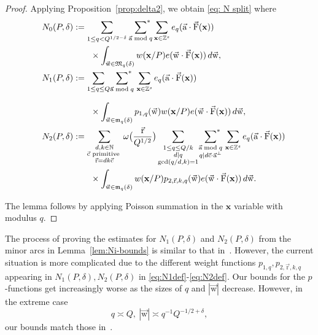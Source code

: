 \documentclass[letterpaper,11pt]{amsart}
\numberwithin{equation}{section}
\theoremstyle{definition}
\numberwithin{equation}{section}
\newcommand{\Z}{\mathbb{Z}}
\newcommand{\NN}{\mathbb{N}}
\newcommand{\x}{\mathbf{x}}
\newcommand{\starsum}{\sideset{}{^*}\sum}
\newcommand{\ua}{\vec{\mathrm{a}}}
\newcommand{\ur}{\vec{\mathrm{r}}}
\newcommand{\uw}{{\vec{\mathrm{w}}}}
\newcommand{\uF}{{\vec{\mathrm{F}} }}
\newcommand{\uc}{{\vec{\mathrm{c}}}}
\newcommand{\scrm}{\mathfrak{m}}
\newcommand{\nF}{\uF}
\begin{document}
\begin{proof}
Applying Proposition~\ref{prop:delta2}, we obtain \eqref{eq: N split}
where 
\begin{align*}
\quad N_0(P, \delta)&:=\sum_{1\leq q< Q^{1/2-\delta}}
			\,\,{\starsum_{\ua\bmod{q}}}\sum_{\x\in \Z^s}e_q(\ua \cdot \nF(\x))			
			\\\ &\quad \quad \times\int_{\uw\in \mathfrak M_q(\delta)}
			w(\x/P)e(\uw\cdot \nF(\x))\,d\uw,\\
	\quad N_1(P, \delta)&:=\sum_{1\leq q\leq Q}
			\underset{\hphantom{\ua\bmod{q}}}{\starsum_{\ua\bmod{q}}}	\sum_{\x\in \Z^s}e_q(\ua \cdot \nF(\x))					
			\\ &\quad \quad \times \int_{\uw\in\scrm_q(\delta)}
			p_{1,q}(\uw)
			w(\x/P)e(\uw\cdot \nF(\x))\,d\uw,\\
			\quad N_2(P, \delta)&:=\sum_{\substack{d,k\in \NN\\ \uc \text{ primitive }\\ \ur=dk\uc}}\omega\big(\frac{\ur}{Q^{1/2}}\big)\sum_{\substack{1\leq q\leq Q/k\\ d\mid q\\ \gcd(q/d,k)=1}}
			\underset{\hphantom{\ua\bmod{q}}}{\starsum_{\substack{\ua\bmod{q}\\ q\mid d\uc\cdot \ua^\perp}}}	\sum_{\x\in \Z^s}e_q(\ua \cdot \nF(\x))\\
   & \quad \quad  \times
			\int_{\uw\in\scrm_q(\delta)}w(\x/P)
			p_{2,\ur,k,q}(\uw)
			e(\uw\cdot \nF(\x))\,d\uw.
\end{align*}

The lemma follows by applying Poisson summation in the $\x$ variable with modulus $q$. 
\end{proof}

The process of proving the estimates for $N_1(P, \delta)$ and $N_2(P, \delta)$ from the minor arcs in Lemma~\ref{lem:Ni-bounds}
 is similar to that in~\cite{V19}. However, the current situation is more complicated due to the different weight functions $ p_{1,q},p_{2,\ur,k,q}$ appearing in $N_1(P, \delta), N_2(P, \delta)$ in \eqref{eq:N1def}-\eqref{eq:N2def}. Our bounds for the $p$-functions get increasingly worse as the sizes of $q$ and $|\uw|$ decrease. However, in the extreme case  \[q\asymp Q,\  |\uw|\asymp q^{-1}Q^{-1/2+\delta},\]
our bounds match those in~\cite{V19}.
\end{document}
